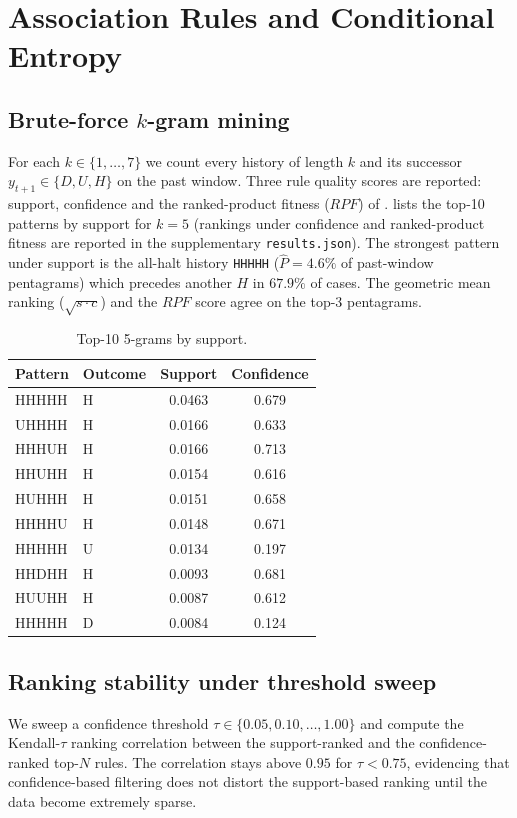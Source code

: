 \documentclass[runningheads]{llncs}
\begin{document}
\section{Association Rules and Conditional Entropy}\label{sec:rules}
\subsection{Brute-force $k$-gram mining}\label{sec:rules:kgram}
For each $k\in\{1,\dots,7\}$ we count every history of length $k$ and
its successor $y_{t+1}\in\{D,U,H\}$ on the past window. Three rule
quality scores are reported: support, confidence and the
ranked-product fitness ($\mathit{RPF}$) of
\cite{agrawal1993}.  lists the
top-10 patterns by support for $k{=}5$ (rankings under confidence and
ranked-product fitness are reported in the supplementary
\texttt{results.json}). The strongest pattern
under support is the all-halt history \texttt{HHHHH} ($\hat{P}{=}4.6\%$
of past-window pentagrams) which precedes another $H$ in $67.9\%$ of
cases. The geometric mean ranking ($\sqrt{s\!\cdot\!c}$) and the
$\mathit{RPF}$ score agree on the top-3 pentagrams.
\begin{table}[!htbp]
\centering\scriptsize
\caption{Top-10 5-grams by support.}\label{tab:topsupp}
\begin{tabular}{l l S[round-precision=4] S[round-precision=3]}
\toprule
Pattern & Outcome & {Support} & {Confidence}\\
\midrule
HHHHH & H & 0.0463 & 0.679 \\
UHHHH & H & 0.0166 & 0.633 \\
HHHUH & H & 0.0166 & 0.713 \\
HHUHH & H & 0.0154 & 0.616 \\
HUHHH & H & 0.0151 & 0.658 \\
HHHHU & H & 0.0148 & 0.671 \\
HHHHH & U & 0.0134 & 0.197 \\
HHDHH & H & 0.0093 & 0.681 \\
HUUHH & H & 0.0087 & 0.612 \\
HHHHH & D & 0.0084 & 0.124 \\
\bottomrule
\end{tabular}
\end{table}

\subsection{Ranking stability under threshold sweep}\label{sec:rules:tau}
We sweep a confidence threshold
$\tau\in\{0.05,0.10,\dots,1.00\}$ and compute the Kendall-$\tau$
ranking correlation between the support-ranked and the
confidence-ranked top-$N$ rules. The correlation stays above $0.95$ for
$\tau<0.75$, evidencing that confidence-based filtering does not
distort the support-based ranking until the data become extremely
sparse.
\end{document}
